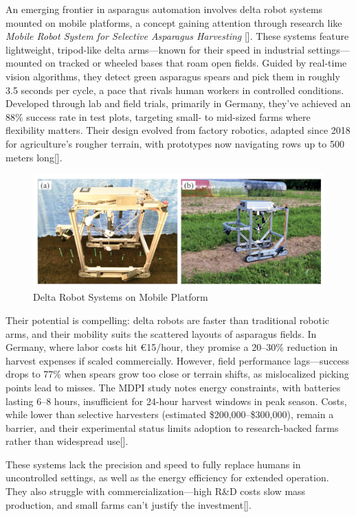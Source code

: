 An emerging frontier in asparagus automation involves delta robot systems mounted on mobile platforms, a concept gaining attention through research like \textit{Mobile Robot System for Selective Asparagus Harvesting} [\cite{mdpi2023mobile}]. These systems feature lightweight, tripod-like delta arms—known for their speed in industrial settings—mounted on tracked or wheeled bases that roam open fields. Guided by real-time vision algorithms, they detect green asparagus spears and pick them in roughly 3.5 seconds per cycle, a pace that rivals human workers in controlled conditions. Developed through lab and field trials, primarily in Germany, they’ve achieved an 88\% success rate in test plots, targeting small- to mid-sized farms where flexibility matters. Their design evolved from factory robotics, adapted since 2018 for agriculture’s rougher terrain, with prototypes now navigating rows up to 500 meters long[\cite{sparters2020automated}].
\begin{figure}
    \centering
    \includegraphics[width=0.75\linewidth]{pictures/delta_robot.png}
    \caption{Delta Robot Systems on Mobile Platform}
    \label{fig:enter-label}
\end{figure}





Their potential is compelling: delta robots are faster than traditional robotic arms, and their mobility suits the scattered layouts of asparagus fields. In Germany, where labor costs hit €15/hour, they promise a 20--30\% reduction in harvest expenses if scaled commercially. However, field performance lags—success drops to 77\% when spears grow too close or terrain shifts, as mislocalized picking points lead to misses. The MDPI study notes energy constraints, with batteries lasting 6--8 hours, insufficient for 24-hour harvest windows in peak season. Costs, while lower than selective harvesters (estimated \$200,000--\$300,000), remain a barrier, and their experimental status limits adoption to research-backed farms rather than widespread use[\cite{mdpi2023mobile}].

These systems lack the precision and speed to fully replace humans in uncontrolled settings, as well as the energy efficiency for extended operation. They also struggle with commercialization—high R\&D costs slow mass production, and small farms can’t justify the investment[\cite{waea2004simulation}].


